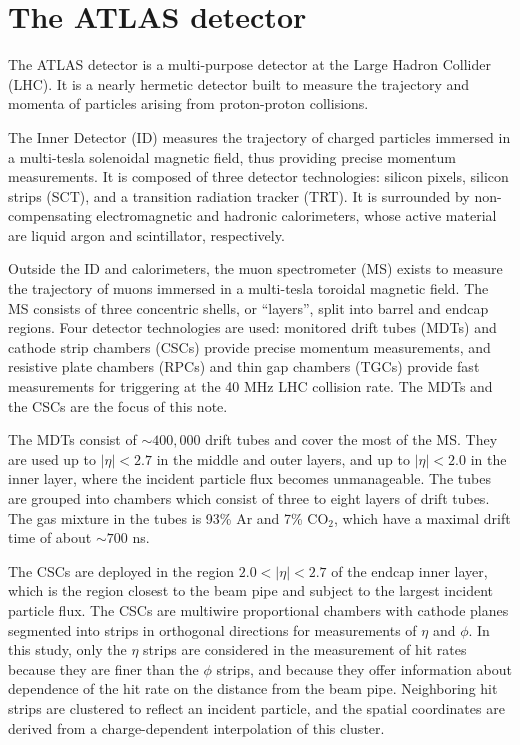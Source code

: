 \section{The ATLAS detector}
\label{sec:detector}

The ATLAS detector is a multi-purpose detector at the Large Hadron Collider (LHC). It is a nearly hermetic detector built to measure the trajectory and momenta of particles arising from proton-proton collisions. 

The Inner Detector (ID) measures the trajectory of charged particles immersed in a multi-tesla solenoidal magnetic field, thus providing precise momentum measurements. It is composed of three detector technologies: silicon pixels, silicon strips (SCT), and a transition radiation tracker (TRT). It is surrounded by non-compensating electromagnetic and hadronic calorimeters, whose active material are liquid argon and scintillator, respectively.

Outside the ID and calorimeters, the muon spectrometer (MS) exists to measure the trajectory of muons immersed in a multi-tesla toroidal magnetic field. The MS consists of three concentric shells, or ``layers'', split into barrel and endcap regions. Four detector technologies are used: monitored drift tubes (MDTs) and cathode strip chambers (CSCs) provide precise momentum measurements, and resistive plate chambers (RPCs) and thin gap chambers (TGCs) provide fast measurements for triggering at the 40 MHz LHC collision rate. The MDTs and the CSCs are the focus of this note.

The MDTs consist of $\sim\!400,000$ drift tubes and cover the most of the MS. They are used up to $|\eta| < 2.7$ in the middle and outer layers, and up to $|\eta| < 2.0$ in the inner layer, where the incident particle flux becomes unmanageable. The tubes are grouped into chambers which consist of three to eight layers of drift tubes. The gas mixture in the tubes is 93\% Ar and 7\% $\text{CO}_2$, which have a maximal drift time of about $\sim\!700$ ns.

The CSCs are deployed in the region $2.0 < |\eta| < 2.7$ of the endcap inner layer, which is the region closest to the beam pipe and subject to the largest incident particle flux. The CSCs are multiwire proportional chambers with cathode planes segmented into strips in orthogonal directions for measurements of $\eta$ and $\phi$. In this study, only the $\eta$ strips are considered in the measurement of hit rates because they are finer than the $\phi$ strips, and because they offer information about dependence of the hit rate on the distance from the beam pipe. Neighboring hit strips are clustered to reflect an incident particle, and the spatial coordinates are derived from a charge-dependent interpolation of this cluster.

